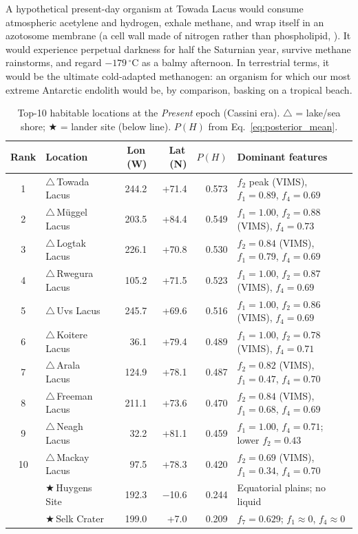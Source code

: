 A hypothetical present-day organism at Towada Lacus would consume atmospheric acetylene and hydrogen, exhale methane, and wrap itself in an azotosome membrane (a cell wall made of nitrogen rather than phospholipid, \citealt{Stevenson2015}).  It would experience perpetual darkness for half the Saturnian year, survive methane rainstorms, and regard $-179\,^{\circ}$C as a balmy afternoon.  In terrestrial terms, it would be the ultimate cold-adapted methanogen: an organism for which our most extreme Antarctic endolith \citep{Friedmann1982} would be, by comparison, basking on a tropical beach.



\begin{table}[H]
\centering
\small
\begin{tabular}{clrrrp{4.5cm}}
\toprule
\textbf{Rank} & \textbf{Location} & \textbf{Lon\,(\textdegree{}W)} & \textbf{Lat\,(\textdegree{}N)} & \textbf{$P(H)$} & \textbf{Dominant features} \\
\midrule
1  & $\triangle$\,Towada Lacus         & 244.2 & +71.4 & 0.573 & $f_2$ peak (VIMS), $f_1{=}0.89$, $f_4{=}0.69$ \\
2  & $\triangle$\,Müggel Lacus         & 203.5 & +84.4 & 0.549 & $f_1{=}1.00$, $f_2{=}0.88$ (VIMS), $f_4{=}0.73$ \\
3  & $\triangle$\,Logtak Lacus         & 226.1 & +70.8 & 0.530 & $f_2{=}0.84$ (VIMS), $f_1{=}0.79$, $f_4{=}0.69$ \\
4  & $\triangle$\,Rwegura Lacus        & 105.2 & +71.5 & 0.523 & $f_1{=}1.00$, $f_2{=}0.87$ (VIMS), $f_4{=}0.69$ \\
5  & $\triangle$\,Uvs Lacus            & 245.7 & +69.6 & 0.516 & $f_1{=}1.00$, $f_2{=}0.86$ (VIMS), $f_4{=}0.69$ \\
6  & $\triangle$\,Koitere Lacus        &  36.1 & +79.4 & 0.489 & $f_1{=}1.00$, $f_2{=}0.78$ (VIMS), $f_4{=}0.71$ \\
7  & $\triangle$\,Arala Lacus          & 124.9 & +78.1 & 0.487 & $f_2{=}0.82$ (VIMS), $f_1{=}0.47$, $f_4{=}0.70$ \\
8  & $\triangle$\,Freeman Lacus        & 211.1 & +73.6 & 0.470 & $f_2{=}0.84$ (VIMS), $f_1{=}0.68$, $f_4{=}0.69$ \\
9  & $\triangle$\,Neagh Lacus          &  32.2 & +81.1 & 0.459 & $f_1{=}1.00$, $f_4{=}0.71$; lower $f_2{=}0.43$ \\
10 & $\triangle$\,Mackay Lacus         &  97.5 & +78.3 & 0.420 & $f_2{=}0.69$ (VIMS), $f_1{=}0.34$, $f_4{=}0.70$ \\
\midrule
 & $\bigstar$\,Huygens Site & 192.3 & $-$10.6 & 0.244 & Equatorial plains; no liquid \\
 & $\bigstar$\,Selk Crater  & 199.0 & +7.0  & 0.209 & $f_7{=}0.629$; $f_1{\approx}0$, $f_4{\approx}0$ \\
\bottomrule
\end{tabular}
\caption{Top-10 habitable locations at the \textit{Present} epoch (Cassini era).
  $\triangle$ = lake/sea shore; $\bigstar$ = lander site (below line).
  $P(H)$ from Eq.~\ref{eq:posterior_mean}.}
\label{tab:top10_present}
\end{table}

